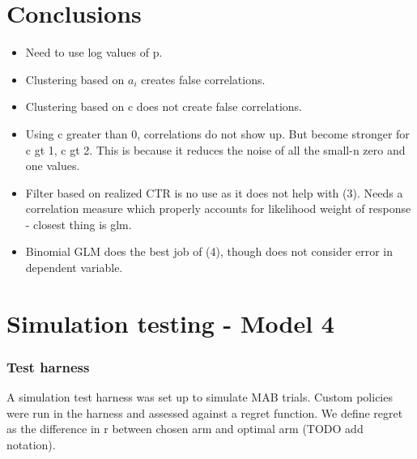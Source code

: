 \documentclass[11pt,a4,singlespacing,titlepagenumber=on]{scrreprt}
\numberwithin{equation}{chapter} %
\theoremstyle{remark}
\begin{document}
\chapter{Conclusions}

\begin{itemize}
	\item Need to use log values of p.
	\item Clustering based on $a_i$ creates false correlations.
	\item Clustering based on c does not create false correlations.
	\item Using c greater than 0, correlations do not show up. But become stronger for c gt 1, c gt 2. This is because it reduces the noise of all the small-n zero and one values.
	\item Filter based on realized CTR is no use as it does not help with (3). Needs a correlation measure which properly accounts for likelihood weight of response - closest thing is glm.
	\item Binomial GLM does the best job of (4), though does not consider error in dependent variable.
\end{itemize}














\chapter{ Simulation testing - Model 4}

\subsection{Test harness}

A simulation test harness was set up to simulate MAB trials. Custom policies were run in the harness and assessed against a regret function. We define regret as the difference in r between chosen arm and optimal arm (TODO add notation).
\end{document}
